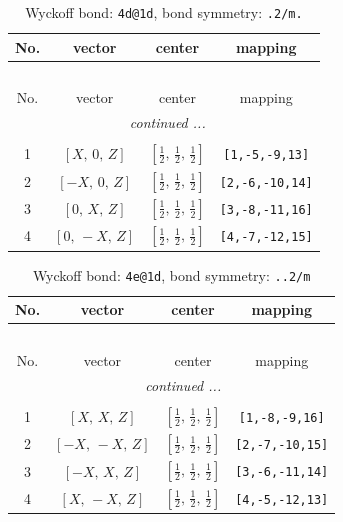 \documentclass[fleqn,8pt]{jsarticle}
\begin{document}
\begin{longtable}{cccc}
\caption{Wyckoff bond: {\tt 4d@1d}, bond symmetry: {\tt .2/m.}}
 \\
 \hline \hline
No. & vector & center & mapping \\ \hline \endfirsthead

\multicolumn{3}{l}{\tablename\ \thetable{}} \\
 \hline \hline
No. & vector & center & mapping \\ \hline \endhead

 \hline \hline
\multicolumn{3}{r}{\footnotesize\it continued ...} \\ \endfoot

 \hline \hline
\multicolumn{3}{r}{} \\ \endlastfoot

1 & $\left[ X,\, 0,\, Z \right]$ & $\left[ \frac{1}{2},\, \frac{1}{2},\, \frac{1}{2} \right]$ & {\tt [1,-5,-9,13]} \\ \hline
2 & $\left[ - X,\, 0,\, Z \right]$ & $\left[ \frac{1}{2},\, \frac{1}{2},\, \frac{1}{2} \right]$ & {\tt [2,-6,-10,14]} \\ \hline
3 & $\left[ 0,\, X,\, Z \right]$ & $\left[ \frac{1}{2},\, \frac{1}{2},\, \frac{1}{2} \right]$ & {\tt [3,-8,-11,16]} \\ \hline
4 & $\left[ 0,\, - X,\, Z \right]$ & $\left[ \frac{1}{2},\, \frac{1}{2},\, \frac{1}{2} \right]$ & {\tt [4,-7,-12,15]} \\
\end{longtable}
\renewcommand{\arraystretch}{1.2}
\begin{longtable}{cccc}
\caption{Wyckoff bond: {\tt 4e@1d}, bond symmetry: {\tt ..2/m}}
 \\
 \hline \hline
No. & vector & center & mapping \\ \hline \endfirsthead

\multicolumn{3}{l}{\tablename\ \thetable{}} \\
 \hline \hline
No. & vector & center & mapping \\ \hline \endhead

 \hline \hline
\multicolumn{3}{r}{\footnotesize\it continued ...} \\ \endfoot

 \hline \hline
\multicolumn{3}{r}{} \\ \endlastfoot

1 & $\left[ X,\, X,\, Z \right]$ & $\left[ \frac{1}{2},\, \frac{1}{2},\, \frac{1}{2} \right]$ & {\tt [1,-8,-9,16]} \\ \hline
2 & $\left[ - X,\, - X,\, Z \right]$ & $\left[ \frac{1}{2},\, \frac{1}{2},\, \frac{1}{2} \right]$ & {\tt [2,-7,-10,15]} \\ \hline
3 & $\left[ - X,\, X,\, Z \right]$ & $\left[ \frac{1}{2},\, \frac{1}{2},\, \frac{1}{2} \right]$ & {\tt [3,-6,-11,14]} \\ \hline
4 & $\left[ X,\, - X,\, Z \right]$ & $\left[ \frac{1}{2},\, \frac{1}{2},\, \frac{1}{2} \right]$ & {\tt [4,-5,-12,13]} \\
\end{longtable}
\end{document}
